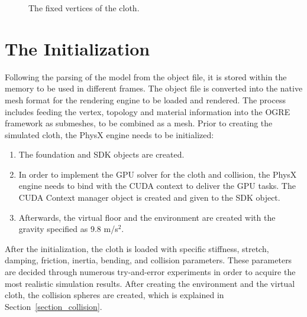 \begin{figure}[ht]
\centerline{}
\caption{The fixed vertices of the cloth.}
\label{fig:cloth_fixed_vertices}
\end{figure}

\section{The Initialization}

Following the parsing of the model from the object file, it is stored within the memory to be used in different frames. The object file is converted into the native mesh format for the rendering engine to be loaded and rendered. The process includes feeding the vertex, topology and material information into the OGRE framework as submeshes, to be combined as a mesh. Prior to creating the simulated cloth, the PhysX engine needs to be initialized:

\begin{enumerate}
\item The foundation and SDK objects are created.
\item In order to implement the GPU solver for the cloth and collision, the PhysX engine needs to bind with the CUDA context to deliver the GPU tasks. The CUDA Context manager object is created and given to the SDK object.
\item Afterwards, the virtual floor and the environment are created with the gravity specified as 9.8 m/s$^2$. 
\end{enumerate}

After the initialization, the cloth is loaded with specific stiffness, stretch, damping, friction, inertia, bending, and collision parameters. These parameters are decided through numerous try-and-error experiments in order to acquire the most realistic simulation results. After creating the environment and the virtual cloth, the collision spheres are created, which is explained in Section~\ref{section_collision}.

